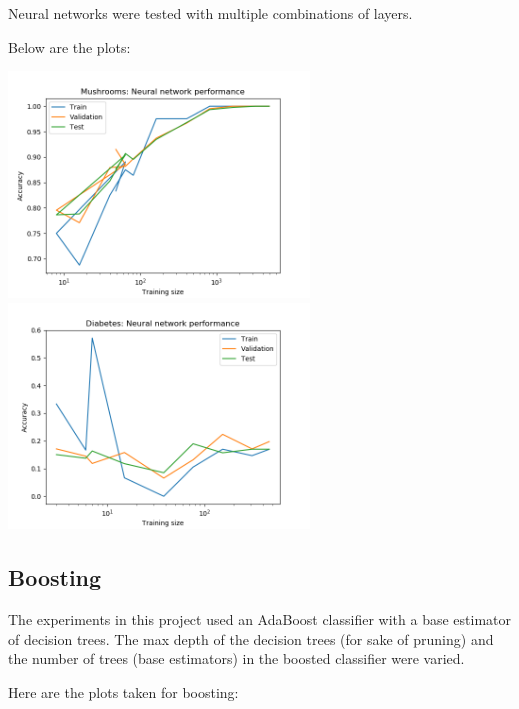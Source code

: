 \documentclass[11pt]{article}
\begin{document}
        Neural networks were tested with multiple combinations of layers.

        Below are the plots:

        \includegraphics[width=8cm]{mushrooms/mushroom_nn_trainingsize.png}
        \includegraphics[width=8cm]{diabetes/diabetes_nn_trainingsize.png}

        \subsection{Boosting}
        The experiments in this project used an AdaBoost classifier with a base estimator of decision trees.
        The max depth of the decision trees (for sake of pruning) and the number of trees (base estimators)
        in the boosted classifier were varied.

        Here are the plots taken for boosting:
\end{document}
